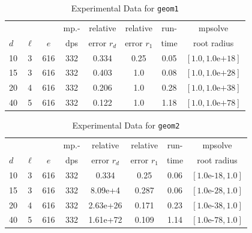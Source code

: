 \documentclass[runningheads]{llncs}
\begin{document}
\begin{table}
\caption{Experimental Data for \texttt{geom1}} %
\label{tab:geom1}
\vskip -0.15in
\begin{center}
\begin{small}
\begin{sc}
\begin{tabular}{lccccccc}
\toprule
&  &  & mp.-& relative  & relative & run- & mpsolve \\
$d$& $\ell$& $e$ & dps&error $r_d$       & error $r_1$ &time& root radius\\
\midrule
 10 & 3 & 616 & 332 & 0.334 & 0.25 & 0.05 & $[1.0, 1.0\text{e+}18]$\\
 15 & 3 & 616 & 332 & 0.403 & 1.0 & 0.08 & $[1.0, 1.0\text{e+}28]$\\
 20 & 4 & 616 & 332 & 0.206 & 1.0 & 0.28 & $[1.0, 1.0\text{e+}38]$\\
 40 & 5 & 616 & 332 & 0.122 & 1.0 & 1.18 & $[1.0, 1.0\text{e+}78]$\\
\bottomrule
\end{tabular}
\end{sc}
\end{small}
\end{center}
\vskip 0.05in
\end{table}

\begin{table}
\caption{Experimental Data for \texttt{geom2}} %
\label{tab:geom2}
\vskip -0.15in
\begin{center}
\begin{small}
\begin{sc}
\begin{tabular}{lccccccc}
\toprule
&  &  & mp.-& relative  & relative & run- & mpsolve \\
$d$& $\ell$& $e$ & dps&error $r_d$       & error $r_1$ &time& root radius\\
\midrule
 10 & 3 & 616 & 332 & 0.334 & 0.25 & 0.06 & $[1.0\text{e-}18, 1.0]$\\
 15 & 3 & 616 & 332 & 8.09e+4 & 0.287 & 0.06 & $[1.0\text{e-}28, 1.0]$\\
 20 & 4 & 616 & 332 & 2.63e+26 & 0.171 & 0.23 & $[1.0\text{e-}38, 1.0]$\\
 40 & 5 & 616 & 332 & 1.61e+72 & 0.109 & 1.14 & $[1.0\text{e-}78, 1.0]$\\
\bottomrule
\end{tabular}
\end{sc}
\end{small}
\end{center}
\vskip 0.05in
\end{table}
\end{document}
